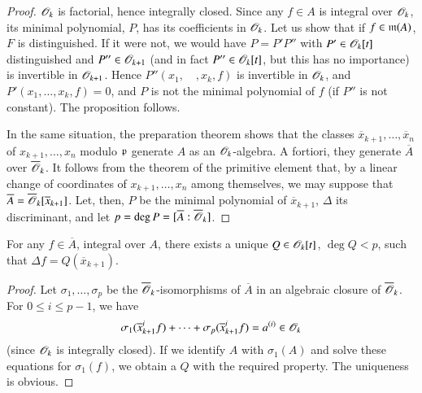 \begin{proof}
$\mathscr{O}_{k}$ is factorial, hence integrally closed. Since any $f\in A$ is integral over $\mathscr{O}_{k}$, its minimal polynomial, $P$, has its coefficients in $\mathscr{O}_{k}$. Let us show that if $f\in \mathfrak{m}(A)$, $F$ is distinguished. If it were not, we would have $P=P'P''$ with $P'\in \mathscr{O}_{k}[t]$ distinguished and $P''\in \mathscr{O}_{k+1}$ (and in fact $P''\in \mathscr{O}_{k}[t]$, but this has no importance) is invertible in $\mathscr{O}_{k+1}$. Hence $P''(x_{1},\quad,x_{k},f)$ is invertible in $\mathscr{O}_{k}$, and $P'(x_{1},\ldots,x_{k},f)=0$, and $P$ is not the minimal polynomial of $f$ (if $P''$ is not constant). The proposition follows.

In the same situation, the preparation theorem shows that the classes $\overline{x}_{k+1},\ldots,\overline{x}_{n}$ of $x_{k+1},\ldots,x_{n}$ modulo $\mathfrak{p}$ generate $A$ as an $\mathscr{O}_{k}$-algebra. A fortiori, they generate $\overline{A}$ over $\overline{\mathscr{O}}_{k}$. It follows from the theorem of the primitive element that, by a linear change of coordinates of $x_{k+1},\ldots,x_{n}$ among themselves, we may suppose that $\overline{A}=\overline{\mathscr{O}}_{k}[\overline{x}_{k+1}]$. Let, then, $P$ be the minimal polynomial of $\overline{x}_{k+1}$, $\Delta$ its discriminant, and let $p=\deg P=[\overline{A}:\overline{\mathscr{O}}_{k}]$.
\end{proof}

\begin{proposition}\label{chap3-prop5.7}
For any $f\in \overline{A}$, integral over $A$, there exists a unique $Q\in \mathscr{O}_{k}[t]$, $\deg Q<p$, such that $\Delta f=Q(\overline{x}_{k+1})$.
\end{proposition}

\eject

\begin{proof}
Let $\sigma_{1},\ldots,\sigma_{p}$ be the $\overline{\mathscr{O}}_{k}$-isomorphisms of $\overline{A}$ in an algebraic closure of $\overline{\mathscr{O}}_{k}$. For $0\leq i\leq p-1$, we have
$$
\sigma_{1}(\overline{x}^{i}_{k+1}f)+\cdots+\sigma_{p}(\overline{x}^{i}_{k+1}f)=a^{(i)}\in \mathscr{O}_{k}
$$
(since $\mathscr{O}_{k}$ is integrally closed). If we identify $A$ with $\sigma_{1}(A)$ and solve these equations for $\sigma_{1}(f)$, we obtain a $Q$ with the required property. The uniqueness is obvious.
\end{proof}


